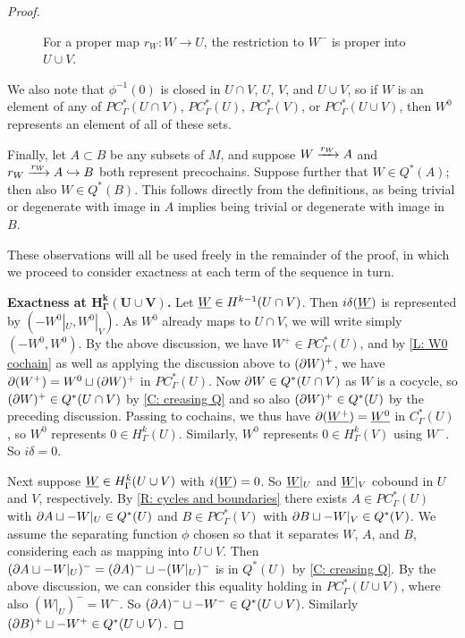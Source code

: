 \begin{proof}
	\begin{figure}[h]
		
		\caption{For a proper map $r_W \colon W \to U$, the restriction to $W^-$ is proper into $U \cup V$.}
		\label{F: MV2}
	\end{figure}

	We also note that $\phi^{-1}(0)$ is closed in $U \cap V$, $U$, $V$, and $U \cup V$, so if $W$ is an element of any of $PC_\Gamma^*(U \cap V)$, $PC_\Gamma^*(U)$, $PC_\Gamma^*(V)$, or $PC_\Gamma^*(U \cup V)$, then $W^0$ represents an element of all of these sets.

	Finally, let $A \subset B$ be any subsets of $M$, and suppose $W \xrightarrow{r_W} A$ and $r_W \xrightarrow{r_W} A \hookrightarrow B$ both represent precochains.
	Suppose further that $W \in Q^*(A)$; then also $W \in Q^*(B)$.
	This follows directly from the definitions, as being trivial or degenerate with image in $A$ implies being trivial or degenerate with image in $B$.

	These observations will all be used freely in the remainder of the proof, in which we proceed to consider exactness at each term of the sequence in turn.

	\textbf{Exactness at $\mathbf{H^k_\Gamma(U \cup V)}$.}
	Let $\underline{W} \in H^{k-1}(U \cap V)$.
	Then $i\delta(\underline{W})$ is represented by $(-W^0|_U, W^0|_V)$.
	As $W^0$ already maps to $U \cap V$, we will write simply $(-W^0, W^0)$.
	By the above discussion, we have $W^+ \in PC^*_\Gamma(U)$, and by \cref{L: W0 cochain} as well as applying the discussion above to $(\partial W)^+$, we have $\partial (W^+) = W^0 \sqcup (\partial W)^+$ in $PC^*_\Gamma(U)$.
	Now $\partial W \in Q^*(U \cap V)$ as $W$ is a cocycle, so $(\partial W)^+ \in Q^*(U \cap V)$ by \cref{C: creasing Q} and so also $(\partial W)^+ \in Q^*(U)$ by the preceding discussion.
	Passing to cochains, we thus have $\partial (\underline{W^+}) = \underline{W^0}$ in $C^*_\Gamma(U)$, so $W^0$ represents $0 \in H^k_\Gamma(U)$.
	Similarly, $W^0$ represents $0 \in H^k_\Gamma(V)$ using $W^-$.
	So $i\delta = 0$.

	Next suppose $\underline{W} \in H^k_\Gamma(U \cup V)$ with $i(\underline{W}) = 0$.
	So $\underline{W}|_U$ and $\underline{W}|_V$ cobound in $U$ and $V$, respectively.
	By \cref{R: cycles and boundaries} there exists $A \in PC^*_\Gamma(U)$ with $\partial A \sqcup - W|_U \in Q^*(U)$ and $B \in PC^*_\Gamma(V)$ with $\partial B \sqcup - W|_V \in Q^*(V)$.
	We assume the separating function $\phi$ chosen so that it separates $W$, $A$, and $B$, considering each as mapping into $U \cup V$.
	Then $(\partial A \sqcup - W|_U)^- = (\partial A)^- \sqcup - (W|_U)^-$ is in $Q^*(U)$ by \cref{C: creasing Q}.
	By the above discussion, we can consider this equality holding in $PC^*_\Gamma(U \cup V)$, where also $(W|_U)^- = W^-$.
	So $(\partial A)^- \sqcup - W^- \in Q^*(U \cup V)$.
	Similarly $(\partial B)^+ \sqcup - W^+ \in Q^*(U \cup V)$.


\end{proof}
